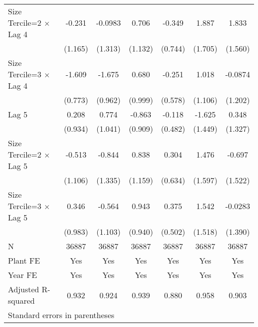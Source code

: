 \begin{table}[htbp]
\begin{tabular}{l*{6}{c}}
\addlinespace
Size Tercile=2 $\times$ Lag 4&   -0.231         &  -0.0983         &    0.706         &   -0.349         &    1.887         &    1.833         \\
                &  (1.165)         &  (1.313)         &  (1.132)         &  (0.744)         &  (1.705)         &  (1.560)         \\
\addlinespace
Size Tercile=3 $\times$ Lag 4&   -1.609\sym{*}  &   -1.675         &    0.680         &   -0.251         &    1.018         &  -0.0874         \\
                &  (0.773)         &  (0.962)         &  (0.999)         &  (0.578)         &  (1.106)         &  (1.202)         \\
\addlinespace
Lag 5           &    0.208         &    0.774         &   -0.863         &   -0.118         &   -1.625         &    0.348         \\
                &  (0.934)         &  (1.041)         &  (0.909)         &  (0.482)         &  (1.449)         &  (1.327)         \\
\addlinespace
Size Tercile=2 $\times$ Lag 5&   -0.513         &   -0.844         &    0.838         &    0.304         &    1.476         &   -0.697         \\
                &  (1.106)         &  (1.335)         &  (1.159)         &  (0.634)         &  (1.597)         &  (1.522)         \\
\addlinespace
Size Tercile=3 $\times$ Lag 5&    0.346         &   -0.564         &    0.943         &    0.375         &    1.542         &  -0.0283         \\
                &  (0.983)         &  (1.103)         &  (0.940)         &  (0.502)         &  (1.518)         &  (1.390)         \\
\midrule
N               &    36887         &    36887         &    36887         &    36887         &    36887         &    36887         \\
Plant FE        &      Yes         &      Yes         &      Yes         &      Yes         &      Yes         &      Yes         \\
Year FE         &      Yes         &      Yes         &      Yes         &      Yes         &      Yes         &      Yes         \\
Adjusted R-squared&    0.932         &    0.924         &    0.939         &    0.880         &    0.958         &    0.903         \\
\bottomrule
\multicolumn{7}{l}{\footnotesize Standard errors in parentheses}\\

\end{tabular}
\end{table}
